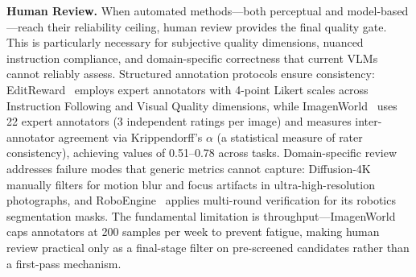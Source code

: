 \textbf{Human Review.}
When automated methods---both perceptual and model-based---reach their reliability ceiling, human review provides the final quality gate. This is particularly necessary for subjective quality dimensions, nuanced instruction compliance, and domain-specific correctness that current VLMs cannot reliably assess. Structured annotation protocols ensure consistency: EditReward~\citep{wu2025editreward} employs expert annotators with 4-point Likert scales across Instruction Following and Visual Quality dimensions, while ImagenWorld~\citep{sani2026imagenworld} uses 22 expert annotators (3 independent ratings per image) and measures inter-annotator agreement via Krippendorff's $\alpha$ (a statistical measure of rater consistency), achieving values of 0.51--0.78 across tasks. Domain-specific review addresses failure modes that generic metrics cannot capture: Diffusion-4K~\citep{zhang2025diffusion} manually filters for motion blur and focus artifacts in ultra-high-resolution photographs, and RoboEngine~\citep{yuan2025roboengine} applies multi-round verification for its robotics segmentation masks. The fundamental limitation is throughput---ImagenWorld caps annotators at 200 samples per week to prevent fatigue, making human review practical only as a final-stage filter on pre-screened candidates rather than a first-pass mechanism.

